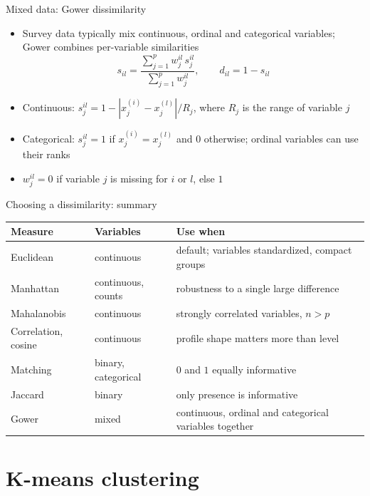 \begin{frame}{Mixed data: Gower dissimilarity}
    \begin{itemize}
        \item Survey data typically mix continuous, ordinal and categorical variables; Gower combines per-variable similarities
        \[
            s_{il} = \frac{\sum_{j=1}^{p} w_j^{il} \, s_j^{il}}{\sum_{j=1}^{p} w_j^{il}}, \qquad d_{il} = 1 - s_{il}
        \]
        \item Continuous: $s_j^{il} = 1 - |x_j^{(i)} - x_j^{(l)}| / R_j$, where $R_j$ is the range of variable $j$
        \item Categorical: $s_j^{il} = 1$ if $x_j^{(i)} = x_j^{(l)}$ and $0$ otherwise; ordinal variables can use their ranks
        \item $w_j^{il} = 0$ if variable $j$ is missing for $i$ or $l$, else $1$
    \end{itemize}
\end{frame}

\begin{frame}{Choosing a dissimilarity: summary}
    \centering
    \footnotesize
    \begin{tabular}{@{}l l p{6.2cm}@{}}
        \toprule
        Measure & Variables & Use when \\
        \midrule
        Euclidean & continuous & default; variables standardized, compact groups \\
        Manhattan & continuous, counts & robustness to a single large difference \\
        Mahalanobis & continuous & strongly correlated variables, $n > p$ \\
        Correlation, cosine & continuous & profile shape matters more than level \\
        Matching & binary, categorical & $0$ and $1$ equally informative \\
        Jaccard & binary & only presence is informative \\
        Gower & mixed & continuous, ordinal and categorical variables together \\
        \bottomrule
    \end{tabular}
\end{frame}


\section{K-means clustering}

